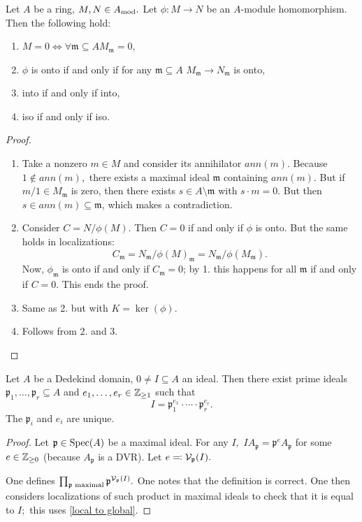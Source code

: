 \begin{lemma}
  \label{local to global}
  Let \(A\) be a ring, \(M, N \in {A}_\mathrm{mod}.\) Let \(\phi \colon M \to N\) be an \(A\)-module homomorphism.
  Then the following hold:
  \begin{enumerate}
  \item \(M = 0 \iff \forall \mathfrak m \subseteq A M_{\mathfrak m} = 0,\)
  \item \(\phi\) is onto if and only if for any \(\mathfrak m \subseteq A\) \(M_{\mathfrak m} \to N_{\mathfrak m}\) is onto,
  \item into if and only if into,
  \item iso if and only if iso.
  \end{enumerate}
\end{lemma}
\begin{proof}
  \begin{enumerate}
  \item Take a  nonzero \(m \in M\) and consider its annihilator \(ann(m).\) Because \(1 \notin ann(m), \) there exists a maximal ideal \(\mathfrak m\) containing \(ann(m).\)
    But if \(m / {1} \in M_{\mathfrak m}\) is zero, then there exists \(s \in A \setminus \mathfrak m\) with \(s \cdot m = 0.\) But then \(s \in ann(m) \subseteq \mathfrak m\), which makes a contradiction.
  \item Consider \(C = N /{\phi(M)}.\) Then \(C = 0\) if and only if \(\phi\) is onto. But the same holds in localizations:
    \[C_{\mathfrak m} = N_{\mathfrak m} /{\phi(M)_{\mathfrak m}} = N_{\mathfrak m} / {\phi(M_{\mathfrak m})}.\]
    Now, \(\phi_{\mathfrak m}\) is onto if and only if \(C_\mathfrak m = 0\); by 1. this happens for all \(\mathfrak m\) if and only if \(C = 0\). This ends the proof.
  \item Same as 2. but with \(K = \ker(\phi).\)
  \item Follows from 2. and 3.
  \end{enumerate}
\end{proof}

\begin{theorem}
  \label{Dedekind thingy}
  Let \(A\) be a Dedekind domain, \(0 \neq I \subseteq A\) an ideal. Then there exist prime ideals \(\mathfrak p_1, \dotsc, \mathfrak p_r \subseteq A\) and \(e_1, \dotsc, e_r \in \mathbb Z_{\geq 1}\) such that
  \[I = \mathfrak p_1^{e_1} \cdot \dotsm \cdot \mathfrak p_r^{e_r}.\]
  The \(\mathfrak p_i\) and \(e_i\) are unique.
\end{theorem}
\begin{proof}
  Let \(\mathfrak p \in \text{Spec}(A)\) be a maximal ideal. For any \(I,\) \(I A_{\mathfrak p} = \mathfrak p^e A_{\mathfrak p}\)  for some \(e \in \mathbb Z_{\geq 0}\) (because \(A_{\mathfrak p}\) is a DVR). Let \(e \eqqcolon \mathcal V_{\mathfrak p}(I).\)

  One defines
  \(\prod_{\mathfrak p \text{ maximal}} \mathfrak p^{\mathcal V_{\mathfrak p}(I)}.\)
  One notes that the definition is correct.
  One then considers localizations of such product in maximal ideals to check that it is equal to \(I;\) this uses \cref{local to global}.
\end{proof}

